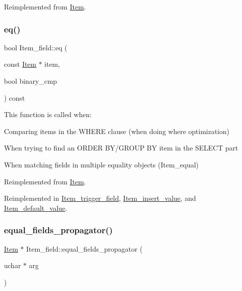 Reimplemented from \mbox{\hyperlink{classItem}{Item}}.

\mbox{\label{classItem__field_a009fb19dc742f706ec5c8bad9a6a0c2d}} 
\subsubsection{\texorpdfstring{eq()}{eq()}}
{\footnotesize\ttfamily bool Item\+\_\+field\+::eq (\begin{DoxyParamCaption}\item[{const \mbox{\hyperlink{classItem}{Item}} $\ast$}]{item,  }\item[{bool}]{binary\+\_\+cmp }\end{DoxyParamCaption}) const\hspace{0.3cm}{\ttfamily [virtual]}}

This function is called when\+:
\begin{DoxyItemize}
\item Comparing items in the W\+H\+E\+RE clause (when doing where optimization)
\item When trying to find an O\+R\+D\+ER B\+Y/\+G\+R\+O\+UP BY item in the S\+E\+L\+E\+CT part
\item When matching fields in multiple equality objects (Item\+\_\+equal) 
\end{DoxyItemize}

Reimplemented from \mbox{\hyperlink{classItem_af0957bbdb9a256de0cd29f1adcae28be}{Item}}.



Reimplemented in \mbox{\hyperlink{classItem__trigger__field_a8ad192808fbb5d42dbc49a0809355478}{Item\+\_\+trigger\+\_\+field}}, \mbox{\hyperlink{classItem__insert__value_aa8be1a5d87cbe34ca0fc197a80522738}{Item\+\_\+insert\+\_\+value}}, and \mbox{\hyperlink{classItem__default__value_a2be2ba1ab394829380e6f0525f9f5d07}{Item\+\_\+default\+\_\+value}}.

\mbox{\label{classItem__field_af886c8bd34afb6700eabba7cb508866a}} 
\subsubsection{\texorpdfstring{equal\+\_\+fields\+\_\+propagator()}{equal\_fields\_propagator()}}
{\footnotesize\ttfamily \mbox{\hyperlink{classItem}{Item}} $\ast$ Item\+\_\+field\+::equal\+\_\+fields\+\_\+propagator (\begin{DoxyParamCaption}\item[{uchar $\ast$}]{arg }\end{DoxyParamCaption})\hspace{0.3cm}{\ttfamily [virtual]}}

